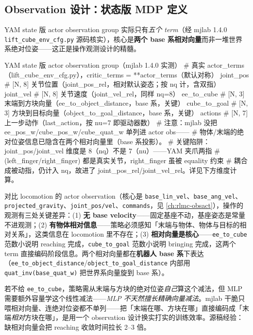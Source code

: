 \subsection{Observation 设计：状态版 MDP 定义}
\label{sec:rlmc-manip-obs}

YAM state 版 actor observation group 实际只有\emph{五个 term}（经 mjlab 1.4.0 \verb|lift_cube_env_cfg.py| 源码核实），核心是\textbf{两个 base 系相对向量}而非一堆世界系绝对位姿——这正是操作观测设计的精髓。

\begin{codebox}[Python]{YAM state 版 actor observation group（mjlab 1.4.0 实测）}
# 真实 actor_terms（lift_cube_env_cfg.py），critic_terms = {**actor_terms}（默认对称）
joint_pos    # [N, 8]  关节位置（joint_pos_rel，相对默认姿态；按 nq 计，含双指）
joint_vel    # [N, 8]  关节速度（joint_vel_rel，同样 nq=8）
ee_to_cube   # [N, 3]  末端到方块向量（ee_to_object_distance，base 系，关键）
cube_to_goal # [N, 3]  方块到目标向量（object_to_goal_distance，base 系，关键）
actions      # [N, 7]  上一步动作（last_action，按 nu=7 即驱动器数）
# 注意：mjlab 没把 ee_pos_w/cube_pos_w/cube_quat_w 单列进 actor obs——
# 物体/末端的绝对位姿信息已隐含在两个相对向量里（base 系投影）。
# 关键陷阱：joint_pos/joint_vel 维度是 8（nq）不是 7（nu）——YAM 夹爪两指
# (left_finger/right_finger) 都是真实关节，right_finger 虽被 equality 约束
# 耦合成被动指，仍计入 nq，故进了 joint_pos_rel/joint_vel_rel。详见下方维度计算。
\end{codebox}

对比 locomotion 的 actor observation（核心是 \verb|base_lin_vel|、\verb|base_ang_vel|、\verb|projected_gravity|、\verb|joint_pos/vel|、\verb|commands|，见 \cref{ch:rlmc-obsact}），操作的观测有三处关键差异：(1) \textbf{无 base velocity}——固定基座不动，基座姿态是常量不进观测；(2) \textbf{有物体相对信息}——策略必须感知「末端与物体、物体与目标的相对关系」，这类信息在 locomotion 里不存在；(3) \textbf{相对向量是核心}——\verb|ee_to_cube| 范数小说明 reaching 完成，\verb|cube_to_goal| 范数小说明 bringing 完成，这两个 term 直接编码阶段信息。两个相对向量都在\textbf{机器人 base 系}下表达（\verb|ee_to_object_distance|/\verb|object_to_goal_distance| 内部用 \verb|quat_inv(base_quat_w)| 把世界系向量旋到 base 系）。

\begin{insight}\label{ins:rlmc-manip-relvec}
若不给 \verb|ee_to_cube|，策略需从末端与方块的绝对位姿\emph{自己}算这个减法，但 MLP 需要额外容量学这个线性减法——\emph{MLP 不天然擅长精确向量减法}。mjlab 干脆只喂相对向量、连绝对位姿都不单列——把「末端在哪、方块在哪」直接编码成「末端\emph{相对}方块在哪」，是用一个 observation 设计换实打实的训练效率。源稿经验：缺相对向量会把 reaching 收敛时间拉长 2--3 倍。
\end{insight}

